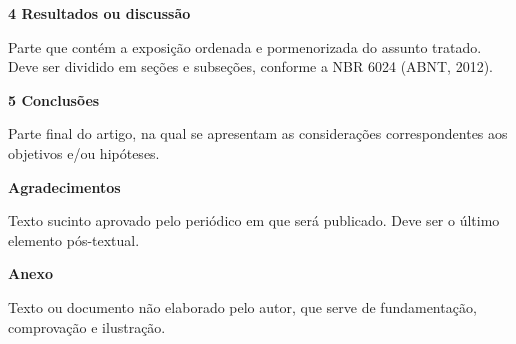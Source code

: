 \documentclass[a4paper, 12pt, oneside] {article}
\begin{document}
\noindent \textbf{4 Resultados ou discussão}

\par [OBRIGATÓRIO] Parte que contém a exposição ordenada e pormenorizada do assunto tratado. Deve ser dividido em seções e subseções, conforme a NBR 6024 (ABNT, 2012).
\singlespacing

\noindent \textbf{5 Conclusões}

\par [OBRIGATÓRIO] Parte final do artigo, na qual se apresentam as considerações correspondentes aos objetivos e/ou hipóteses.
\cite{oxley1992mt}
\singlespacing


\singlespacing

\noindent \textbf{Agradecimentos}

\par Texto sucinto aprovado pelo periódico em que será publicado. Deve ser o último elemento pós-textual.
\singlespacing

\noindent\textbf{Anexo}

\par Texto ou documento não elaborado pelo autor, que serve de fundamentação, comprovação e ilustração.
\end{document}
